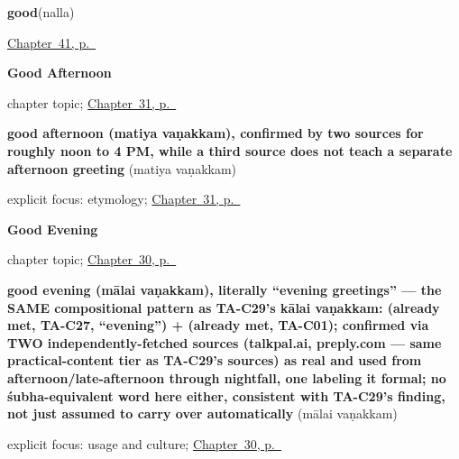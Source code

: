 \noindent\begin{minipage}[t]{\linewidth}
\raggedright
\textbf{good}\enspace\emph{}\enspace(nalla)\par
\footnotesize \hyperref[ch:ta-describing-things]{Chapter~41, p.~\pageref*{ch:ta-describing-things}}
\end{minipage}\par\smallskip

\noindent\begin{minipage}[t]{\linewidth}
\raggedright
\textbf{Good Afternoon}\par
\footnotesize chapter topic; \hyperref[ch:ta-good-afternoon]{Chapter~31, p.~\pageref*{ch:ta-good-afternoon}}
\end{minipage}\par\smallskip

\noindent\begin{minipage}[t]{\linewidth}
\raggedright
\textbf{good afternoon (matiya vaṇakkam), confirmed by two sources for roughly noon to 4 PM, while a third source does not teach a separate afternoon greeting}\enspace\emph{ }\enspace(matiya vaṇakkam)\par
\footnotesize explicit focus: etymology; \hyperref[ch:ta-good-afternoon]{Chapter~31, p.~\pageref*{ch:ta-good-afternoon}}
\end{minipage}\par\smallskip

\noindent\begin{minipage}[t]{\linewidth}
\raggedright
\textbf{Good Evening}\par
\footnotesize chapter topic; \hyperref[ch:ta-good-evening]{Chapter~30, p.~\pageref*{ch:ta-good-evening}}
\end{minipage}\par\smallskip

\noindent\begin{minipage}[t]{\linewidth}
\raggedright
\textbf{good evening (mālai vaṇakkam), literally \textquotedblleft{}evening greetings\textquotedblright{} — the SAME compositional pattern as TA-C29's kālai vaṇakkam:  (already met, TA-C27, \textquotedblleft{}evening\textquotedblright{}) +  (already met, TA-C01); confirmed via TWO independently-fetched sources (talkpal.ai, preply.com — same practical-content tier as TA-C29's sources) as real and used from afternoon/late-afternoon through nightfall, one labeling it formal; no śubha-equivalent word here either, consistent with TA-C29's finding, not just assumed to carry over automatically}\enspace\emph{ }\enspace(mālai vaṇakkam)\par
\footnotesize explicit focus: usage and culture; \hyperref[ch:ta-good-evening]{Chapter~30, p.~\pageref*{ch:ta-good-evening}}
\end{minipage}\par\smallskip

